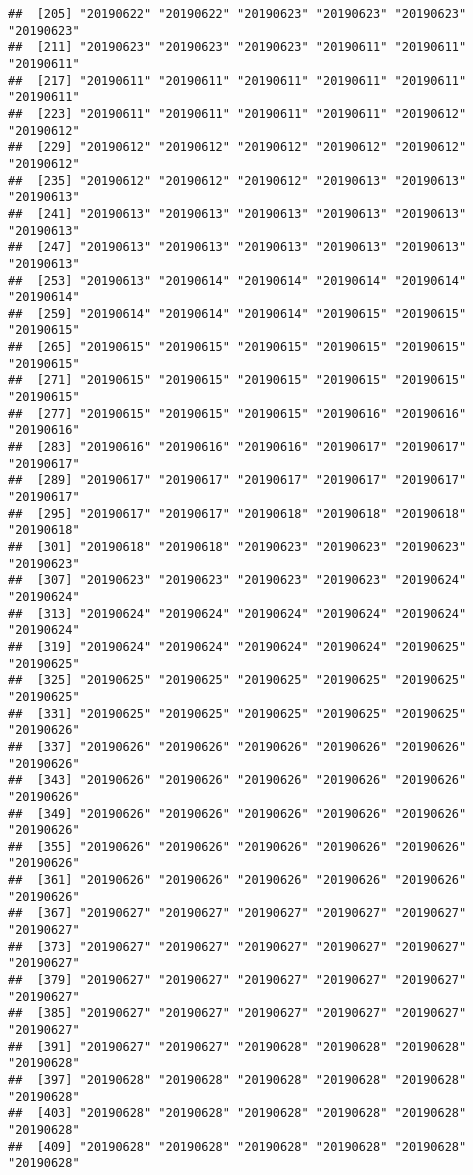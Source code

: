 \documentclass[]{article}
\begin{document}
\begin{verbatim}
##  [205] "20190622" "20190622" "20190623" "20190623" "20190623" "20190623"
##  [211] "20190623" "20190623" "20190623" "20190611" "20190611" "20190611"
##  [217] "20190611" "20190611" "20190611" "20190611" "20190611" "20190611"
##  [223] "20190611" "20190611" "20190611" "20190611" "20190612" "20190612"
##  [229] "20190612" "20190612" "20190612" "20190612" "20190612" "20190612"
##  [235] "20190612" "20190612" "20190612" "20190613" "20190613" "20190613"
##  [241] "20190613" "20190613" "20190613" "20190613" "20190613" "20190613"
##  [247] "20190613" "20190613" "20190613" "20190613" "20190613" "20190613"
##  [253] "20190613" "20190614" "20190614" "20190614" "20190614" "20190614"
##  [259] "20190614" "20190614" "20190614" "20190615" "20190615" "20190615"
##  [265] "20190615" "20190615" "20190615" "20190615" "20190615" "20190615"
##  [271] "20190615" "20190615" "20190615" "20190615" "20190615" "20190615"
##  [277] "20190615" "20190615" "20190615" "20190616" "20190616" "20190616"
##  [283] "20190616" "20190616" "20190616" "20190617" "20190617" "20190617"
##  [289] "20190617" "20190617" "20190617" "20190617" "20190617" "20190617"
##  [295] "20190617" "20190617" "20190618" "20190618" "20190618" "20190618"
##  [301] "20190618" "20190618" "20190623" "20190623" "20190623" "20190623"
##  [307] "20190623" "20190623" "20190623" "20190623" "20190624" "20190624"
##  [313] "20190624" "20190624" "20190624" "20190624" "20190624" "20190624"
##  [319] "20190624" "20190624" "20190624" "20190624" "20190625" "20190625"
##  [325] "20190625" "20190625" "20190625" "20190625" "20190625" "20190625"
##  [331] "20190625" "20190625" "20190625" "20190625" "20190625" "20190626"
##  [337] "20190626" "20190626" "20190626" "20190626" "20190626" "20190626"
##  [343] "20190626" "20190626" "20190626" "20190626" "20190626" "20190626"
##  [349] "20190626" "20190626" "20190626" "20190626" "20190626" "20190626"
##  [355] "20190626" "20190626" "20190626" "20190626" "20190626" "20190626"
##  [361] "20190626" "20190626" "20190626" "20190626" "20190626" "20190626"
##  [367] "20190627" "20190627" "20190627" "20190627" "20190627" "20190627"
##  [373] "20190627" "20190627" "20190627" "20190627" "20190627" "20190627"
##  [379] "20190627" "20190627" "20190627" "20190627" "20190627" "20190627"
##  [385] "20190627" "20190627" "20190627" "20190627" "20190627" "20190627"
##  [391] "20190627" "20190627" "20190628" "20190628" "20190628" "20190628"
##  [397] "20190628" "20190628" "20190628" "20190628" "20190628" "20190628"
##  [403] "20190628" "20190628" "20190628" "20190628" "20190628" "20190628"
##  [409] "20190628" "20190628" "20190628" "20190628" "20190628" "20190628"

\end{verbatim}
\end{document}

